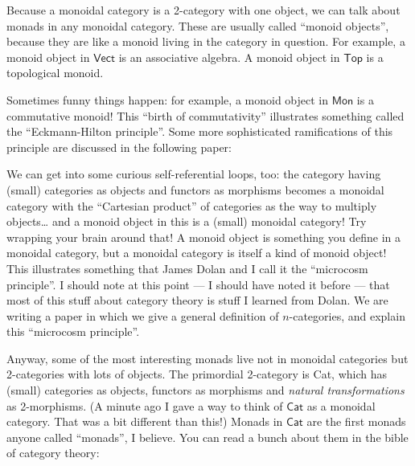 \documentclass{article}
\def\tightlist{}
\renewcommand{\texttt}[1]{%
  \begingroup
  \ttfamily
  \begingroup\lccode`~=`/\lowercase{\endgroup\def~}{/\discretionary{}{}{}}%
  \begingroup\lccode`~=`[\lowercase{\endgroup\def~}{[\discretionary{}{}{}}%
  \begingroup\lccode`~=`.\lowercase{\endgroup\def~}{.\discretionary{}{}{}}%
  \catcode`/=\active\catcode`[=\active\catcode`.=\active
  \scantokens{#1\noexpand}%
  \endgroup
}
\begin{document}
Because a monoidal category is a 2-category with one object, we can talk
about monads in any monoidal category. These are usually called ``monoid
objects'', because they are like a monoid living in the category in
question. For example, a monoid object in \(\mathsf{Vect}\) is an
associative algebra. A monoid object in \(\mathsf{Top}\) is a
topological monoid.

Sometimes funny things happen: for example, a monoid object in
\(\mathsf{Mon}\) is a commutative monoid! This ``birth of
commutativity'' illustrates something called the ``Eckmann-Hilton
principle''. Some more sophisticated ramifications of this principle are
discussed in the following paper:


We can get into some curious self-referential loops, too: the category
having (small) categories as objects and functors as morphisms becomes a
monoidal category with the ``Cartesian product'' of categories as the
way to multiply objects\ldots{} and a monoid object in this is a (small)
monoidal category! Try wrapping your brain around that! A monoid object
is something you define in a monoidal category, but a monoidal category
is itself a kind of monoid object! This illustrates something that James
Dolan and I call it the ``microcosm principle''. I should note at this
point --- I should have noted it before --- that most of this stuff
about category theory is stuff I learned from Dolan. We are writing a
paper in which we give a general definition of \(n\)-categories, and
explain this ``microcosm principle''.

Anyway, some of the most interesting monads live not in monoidal
categories but 2-categories with lots of objects. The primordial
2-category is Cat, which has (small) categories as objects, functors as
morphisms and \emph{natural transformations} as 2-morphisms. (A minute
ago I gave a way to think of \(\mathsf{Cat}\) as a monoidal category.
That was a bit different than this!) Monads in \(\mathsf{Cat}\) are the
first monads anyone called ``monads'', I believe. You can read a bunch
about them in the bible of category theory:
\end{document}
